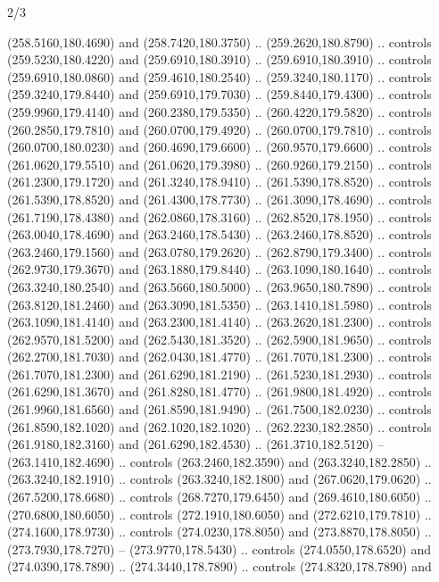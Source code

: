 \begin{flagdescription}{2/3}
\begin{scope}[xshift=0.5\flaglength,yshift=0.5\flagwidth,scale=\flagwidth/259.2]
\begin{scope}[y=0.8pt, x=0.8pt, yscale=-1,shift={(-243,-162)}]
      (258.5160,180.4690) and (258.7420,180.3750) .. (259.2620,180.8790) .. controls
      (259.5230,180.4220) and (259.6910,180.3910) .. (259.6910,180.3910) .. controls
      (259.6910,180.0860) and (259.4610,180.2540) .. (259.3240,180.1170) .. controls
      (259.3240,179.8440) and (259.6910,179.7030) .. (259.8440,179.4300) .. controls
      (259.9960,179.4140) and (260.2380,179.5350) .. (260.4220,179.5820) .. controls
      (260.2850,179.7810) and (260.0700,179.4920) .. (260.0700,179.7810) .. controls
      (260.0700,180.0230) and (260.4690,179.6600) .. (260.9570,179.6600) .. controls
      (261.0620,179.5510) and (261.0620,179.3980) .. (260.9260,179.2150) .. controls
      (261.2300,179.1720) and (261.3240,178.9410) .. (261.5390,178.8520) .. controls
      (261.5390,178.8520) and (261.4300,178.7730) .. (261.3090,178.4690) .. controls
      (261.7190,178.4380) and (262.0860,178.3160) .. (262.8520,178.1950) .. controls
      (263.0040,178.4690) and (263.2460,178.5430) .. (263.2460,178.8520) .. controls
      (263.2460,179.1560) and (263.0780,179.2620) .. (262.8790,179.3400) .. controls
      (262.9730,179.3670) and (263.1880,179.8440) .. (263.1090,180.1640) .. controls
      (263.3240,180.2540) and (263.5660,180.5000) .. (263.9650,180.7890) .. controls
      (263.8120,181.2460) and (263.3090,181.5350) .. (263.1410,181.5980) .. controls
      (263.1090,181.4140) and (263.2300,181.4140) .. (263.2620,181.2300) .. controls
      (262.9570,181.5200) and (262.5430,181.3520) .. (262.5900,181.9650) .. controls
      (262.2700,181.7030) and (262.0430,181.4770) .. (261.7070,181.2300) .. controls
      (261.7070,181.2300) and (261.6290,181.2190) .. (261.5230,181.2930) .. controls
      (261.6290,181.3670) and (261.8280,181.4770) .. (261.9800,181.4920) .. controls
      (261.9960,181.6560) and (261.8590,181.9490) .. (261.7500,182.0230) .. controls
      (261.8590,182.1020) and (262.1020,182.1020) .. (262.2230,182.2850) .. controls
      (261.9180,182.3160) and (261.6290,182.4530) .. (261.3710,182.5120) --
      (263.1410,182.4690) .. controls (263.2460,182.3590) and (263.3240,182.2850) ..
      (263.3240,182.1910) .. controls (263.3240,182.1800) and (267.0620,179.0620) ..
      (267.5200,178.6680) .. controls (268.7270,179.6450) and (269.4610,180.6050) ..
      (270.6800,180.6050) .. controls (272.1910,180.6050) and (272.6210,179.7810) ..
      (274.1600,178.9730) .. controls (274.0230,178.8050) and (273.8870,178.8050) ..
      (273.7930,178.7270) -- (273.9770,178.5430) .. controls (274.0550,178.6520) and
      (274.0390,178.7890) .. (274.3440,178.7890) .. controls (274.8320,178.7890) and

\end{scope}
\end{scope}
\end{flagdescription}
